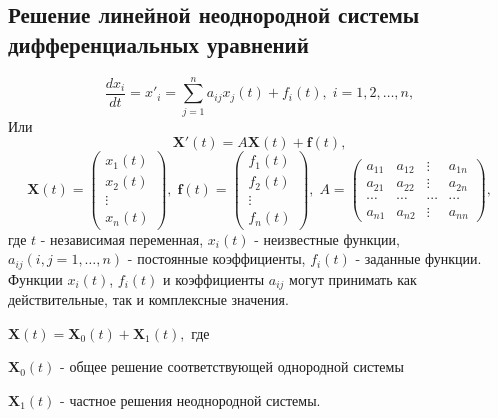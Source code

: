 \documentclass[a5paper,10pt]{article}
\begin{document}
		\subsection{Решение линейной неоднородной системы дифференциальных уравнений}
			$$ \frac{dx_i}{dt} = x\prime_i = \sum\limits_{j=1}^n a_{ij}x_j(t) + f_i(t), \; i = 1,2,\ldots,n, $$
			Или
			$$ \mathbf{X}'\left( t \right) = A\mathbf{X}\left( t \right) + \mathbf{f}\left( t \right), $$
			\begin{equation}
				\mathbf{X}\left( t \right) = \left(
					\begin{array}{*{20}{c}}
						{{x_1}\left( t \right)}\\
						{{x_2}\left( t \right)}\\
						 \vdots \\
						{{x_n}\left( t \right)}
					\end{array}
				\right), \;
				\mathbf{f}\left( t \right) = \left(
					\begin{array}{*{20}{c}}
						{{f_1}\left( t \right)}\\
						{{f_2}\left( t \right)}\\
						 \vdots \\
						{{f_n}\left( t \right)}
					\end{array}
				\right), \;
				A = \left(
					\begin{array}{*{20}{c}}
						{{a_{11}}}&{{a_{12}}}& \vdots &{{a_{1n}}}\\
						{{a_{21}}}&{{a_{22}}}& \vdots &{{a_{2n}}}\\
						 \cdots & \cdots & \cdots & \cdots \\
						{{a_{n1}}}&{{a_{n2}}}& \vdots &{{a_{nn}}}
					\end{array}
				\right),
			\end{equation}
			где $t$ - независимая переменная, $x_i(t)$ - неизвестные функции, $a_{ij}(i,j=1,\ldots,n)$ - постоянные коэффициенты, $f_i(t)$ - заданные функции. Функции $x_i(t)$, $f_i(t)$ и коэффициенты $a_{ij}$ могут принимать как действительные, так и комплексные значения. 
			\begin{framed}
				$ \mathbf{X}\left( t \right) = {\mathbf{X}_0}\left( t \right) + {\mathbf{X}_1}\left( t \right),$ где \par
				$ \mathbf{X}_0(t) $ - общее решение соответствующей однородной системы \par
				$ \mathbf{X}_1(t) $ - частное решения неоднородной системы.
			\end{framed}
\end{document}
